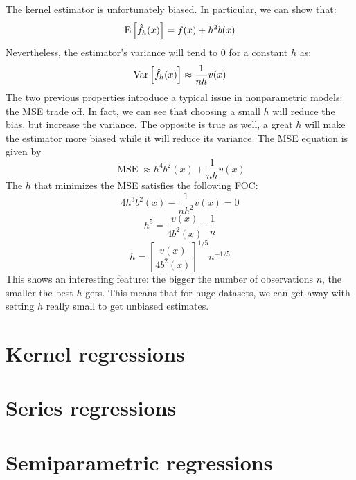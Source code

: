 The kernel estimator is unfortunately biased. In particular, we can show that: $$\operatorname{E}\left[\hat f_h(x)\right] = f(x) + h^2b(x) $$ Nevertheless, the estimator's variance will tend to 0 for a constant $h$ as: $$\operatorname{Var}\left[\hat f_h(x)\right] \approx \frac{1}{nh} v(x) $$ The two previous properties introduce a typical issue in nonparametric models: the MSE trade off. In fact, we can see that choosing a small $h$ will reduce the bias, but increase the variance. The opposite is true as well, a great $h$ will make the estimator more biased while it will reduce its variance. The MSE equation is given by $$\operatorname{MSE} \approx h^4b^2(x) + \frac{1}{nh} v(x) $$ The $h$ that minimizes the MSE satisfies the following FOC: $$4h^3b^2(x) - \frac{1}{nh^2} v(x) = 0 $$ $$ h^5 = \frac{v(x)}{4b^2(x)}\cdot \frac{1}{n} $$ $$ h =\left[\frac{v(x)}{4b^2(x)}\right]^{1/5} n^{-1/5} $$ This shows an interesting feature: the bigger the number of observations $n$, the smaller the best $h$ gets. This means that for huge datasets, we can get away with setting $h$ really small to get unbiased estimates.


\section{Kernel regressions}



\section{Series regressions}



\section{Semiparametric regressions}